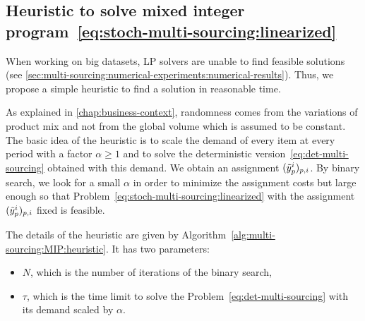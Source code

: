 \subsection{Heuristic to solve mixed integer program~\eqref{eq:stoch-multi-sourcing:linearized}}
\label{sec:multi-sourcing:stochastic:solving-method:heuristic}


When working on big datasets, LP solvers are unable to find feasible solutions (see \cref{sec:multi-sourcing:numerical-experiments:numerical-results}).
Thus, we propose a simple heuristic to find a solution in reasonable time.


As explained in \cref{chap:business-context}, randomness comes from the variations of product mix and not from the global volume which is assumed to be constant.
The basic idea of the heuristic is to scale the demand of every item at every period with a factor $\alpha\ge1$ and to solve the deterministic version~\eqref{eq:det-multi-sourcing} obtained with this demand.
We obtain an assignment $(\tilde{y}_p^i)_{p,i}$.
By binary search, we look for a small $\alpha$ in order to minimize the assignment costs but large enough so that Problem~\eqref{eq:stoch-multi-sourcing:linearized} with the assignment $(\tilde{y}_p^i)_{p,i}$ fixed is feasible.


The details of the heuristic are given by Algorithm~\ref{alg:multi-sourcing:MIP:heuristic}.
It has two parameters:
\begin{itemize}
  \item $N$, which is the number of iterations of the binary search,
  \item $\tau$, which is the time limit to solve the Problem~\eqref{eq:det-multi-sourcing} with its demand scaled by $\alpha$.
\end{itemize}


